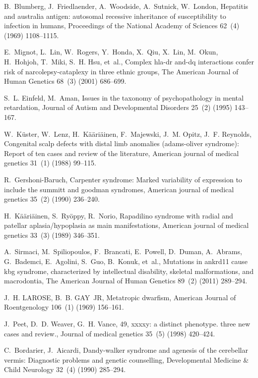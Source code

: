\documentclass{article}
\theoremstyle{definition}
\begin{document}
\begin{thebibliography}{10}
B.~Blumberg, J.~Friedlaender, A.~Woodside, A.~Sutnick, W.~London, Hepatitis and
  australia antigen: autosomal recessive inheritance of susceptibility to
  infection in humans, Proceedings of the National Academy of Sciences 62~(4)
  (1969) 1108--1115.

E.~Mignot, L.~Lin, W.~Rogers, Y.~Honda, X.~Qiu, X.~Lin, M.~Okun, H.~Hohjoh,
  T.~Miki, S.~H. Hsu, et~al., Complex hla-dr and-dq interactions confer risk of
  narcolepsy-cataplexy in three ethnic groups, The American Journal of Human
  Genetics 68~(3) (2001) 686--699.

S.~L. Einfeld, M.~Aman, Issues in the taxonomy of psychopathology in mental
  retardation, Journal of Autism and Developmental Disorders 25~(2) (1995)
  143--167.

W.~K{\"u}ster, W.~Lenz, H.~K{\"a}{\"a}ri{\"a}inen, F.~Majewski, J.~M. Opitz,
  J.~F. Reynolds, Congenital scalp defects with distal limb anomalies
  (adams-oliver syndrome): Report of ten cases and review of the literature,
  American journal of medical genetics 31~(1) (1988) 99--115.

R.~Gershoni-Baruch, Carpenter syndrome: Marked variability of expression to
  include the summitt and goodman syndromes, American journal of medical
  genetics 35~(2) (1990) 236--240.

H.~K{\"a}{\"a}ri{\"a}inen, S.~Ry{\"o}ppy, R.~Norio, Rapadilino syndrome with
  radial and patellar aplasia/hypoplasia as main manifestations, American
  journal of medical genetics 33~(3) (1989) 346--351.

A.~Sirmaci, M.~Spiliopoulos, F.~Brancati, E.~Powell, D.~Duman, A.~Abrams,
  G.~Bademci, E.~Agolini, S.~Guo, B.~Konuk, et~al., Mutations in ankrd11 cause
  kbg syndrome, characterized by intellectual disability, skeletal
  malformations, and macrodontia, The American Journal of Human Genetics 89~(2)
  (2011) 289--294.

J.~H. LAROSE, B.~B. GAY~JR, Metatropic dwarfism, American Journal of
  Roentgenology 106~(1) (1969) 156--161.

J.~Peet, D.~D. Weaver, G.~H. Vance, 49, xxxxy: a distinct phenotype. three new
  cases and review., Journal of medical genetics 35~(5) (1998) 420--424.

C.~Bordarier, J.~Aicardi, Dandy-walker syndrome and agenesis of the cerebellar
  vermis: Diagnostic problems and genetic counselling, Developmental Medicine
  \& Child Neurology 32~(4) (1990) 285--294.


\end{thebibliography}
\end{document}
